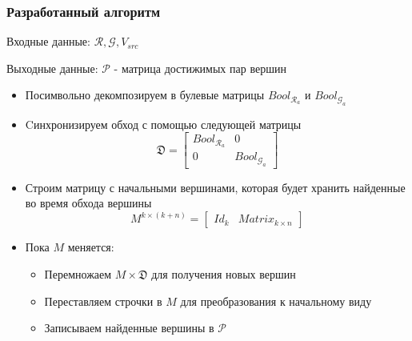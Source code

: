 \documentclass{beamer}
\begin{document}
\begin{frame}[fragile]
  \frametitle{Разработанный алгоритм}
Входные данные: $\mathcal{R}, \mathcal{G}, V_{src}$

Выходные данные: $\mathcal{P}$ - матрица достижимых пар вершин
  \begin{itemize}
      
      \item Посимвольно декомпозируем в булевые матрицы $Bool_{\mathcal{R}_a}$ и $Bool_{\mathcal{G}_a}$
      
      \item Cинхронизируем обход с помощью следующей матрицы
      \begin{equation}
\mathfrak{D} = 
  \left[
    \begin{matrix}
        Bool_{\mathcal{R}_a} & 0\\
        0 & Bool_{\mathcal{G}_a}
    \end{matrix}
  \right]
\end{equation}
    \item Строим матрицу с начальными вершинами, которая будет хранить найденные во время обхода вершины
    \begin{equation}
M^{k \times (k + n)} =
  \left[
    \begin{matrix}
        Id_k & Matrix_{k \times n }
    \end{matrix}
  \right]
\end{equation}
    
    \item Пока $M$ меняется:
\begin{itemize}
    \item Перемножаем $M \times \mathfrak{D}$ для получения новых вершин
    \item Переставляем строчки в $M$ для преобразования к начальному виду
    \item Записываем найденные вершины в $\mathcal{P}$
\end{itemize}
  \end{itemize}
\end{frame}
\end{document}
